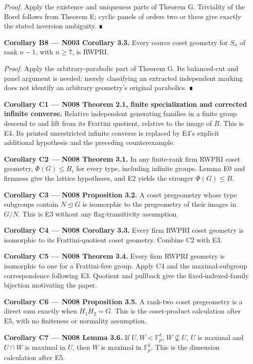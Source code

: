 \documentclass[
  10pt,
  letterpaper,
]{article}
\begin{document}
\emph{Proof.} Apply the existence and uniqueness parts of Theorem G.
Triviality of the Borel follows from Theorem E; cyclic panels of orders
two or three give exactly the stated inversion ambiguity. ∎

\textbf{Corollary B8 --- N003 Corollary 3.3.} Every source coset
geometry for \(S_n\) of rank \(n-1\), with \(n\geq7\), is RWPRI.

\emph{Proof.} Apply the arbitrary-parabolic part of Theorem G. Its
balanced-cut and panel argument is needed: merely classifying an
extracted independent marking does not identify an arbitrary geometry's
original parabolics. ∎

\textbf{Corollary C1 --- N008 Theorem 2.1, finite specialization and
corrected infinite converse.} Relative independent generating families
in a finite group descend to and lift from its Frattini quotient,
relative to the image of \(B\). This is E4. Its printed unrestricted
infinite converse is replaced by E4's explicit additional hypothesis and
the preceding counterexample.

\textbf{Corollary C2 --- N008 Theorem 3.1.} In any finite-rank firm
RWPRI coset geometry, \(\Phi(G)\leq H_i\) for every type, including
infinite groups. Lemma E0 and firmness give the lattice hypotheses, and
E2 yields the stronger \(\Phi(G)\leq B\).

\textbf{Corollary C3 --- N008 Proposition 3.2.} A coset pregeometry
whose type subgroups contain \(N\unlhd G\) is isomorphic to the
pregeometry of their images in \(G/N\). This is E3 without any
flag-transitivity assumption.

\textbf{Corollary C4 --- N008 Corollary 3.3.} Every firm RWPRI coset
geometry is isomorphic to its Frattini-quotient coset geometry. Combine
C2 with E3.

\textbf{Corollary C5 --- N008 Theorem 3.4.} Every firm RWPRI geometry is
isomorphic to one for a Frattini-free group. Apply C4 and the
maximal-subgroup correspondence following E3. Quotient and pullback give
the fixed-indexed-family bijection motivating the paper.

\textbf{Corollary C6 --- N008 Proposition 3.5.} A rank-two coset
pregeometry is a direct sum exactly when \(H_1H_2=G\). This is the
coset-product calculation after E5, with no finiteness or normality
assumption.

\textbf{Corollary C7 --- N008 Lemma 3.6.} If \(U,W<\mathbb F_p^k\),
\(W\not\subseteq U\), \(U\) is maximal and \(U\cap W\) is maximal in
\(U\), then \(W\) is maximal in \(\mathbb F_p^k\). This is the dimension
calculation after E5.
\end{document}
